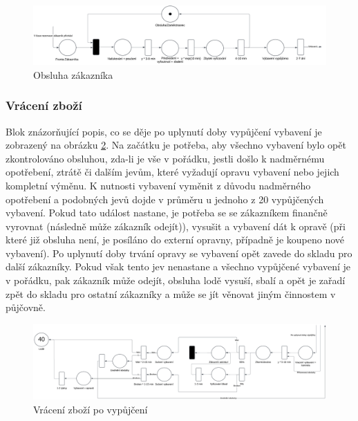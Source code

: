 \documentclass[a4paper, 12pt, hidelinks]{article}
\begin{document}
\begin{figure}[h]
    \centering
    \includegraphics[width=1.0\linewidth]{images/obsluha.png}
    \caption{Obsluha zákazníka}
    \label{fig:service}
\end{figure}

\subsubsection{Vrácení zboží}

Blok znázorňující popis, co se děje po uplynutí doby vypůjčení vybavení je zobrazený na obrázku \ref{fig:return}. Na začátku je potřeba, aby všechno vybavení bylo opět zkontrolováno obsluhou, zda-li je vše v pořádku, jestli došlo k nadměrnému opotřebení, ztrátě či dalším jevům, které vyžadují opravu vybavení nebo jejich kompletní výměnu. K nutnosti vybavení vyměnit z důvodu nadměrného opotřebení a podobných jevů dojde v průměru u jednoho z 20 vypůjčených vybavení. Pokud tato událost nastane, je potřeba se se zákazníkem finančně vyrovnat (následně může zákazník odejít)), vysušit a vybavení dát k opravě (při které již obsluha není, je posíláno do externí opravny, případně je koupeno nové vybavení). Po uplynutí doby trvání opravy se vybavení opět zavede do skladu pro další zákazníky. Pokud však tento jev nenastane a všechno vypůjčené vybavení je v pořádku, pak zákazník může odejít, obsluha lodě vysuší, sbalí a opět je zařadí zpět do skladu pro ostatní zákazníky a může se jít věnovat jiným činnostem v půjčovně.

\begin{figure}
    \centering
    \includegraphics[width=1.0\linewidth]{images/vraceni.png}
    \caption{Vrácení zboží po vypůjčení}
    \label{fig:return}
\end{figure}


\newpage
\end{document}
